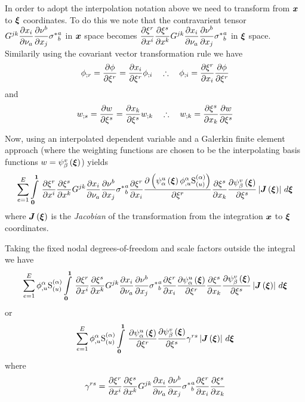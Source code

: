 In order to adopt the interpolation notation above we need to transform from
$\vect{x}$ to $\vect{\xi}$ coordinates. To do this we note that the
contravarient tensor
$G^{jk} \dfrac{\partial x_{i}}{\partial \nu_{a}}  \dfrac{\partial \nu^{b}}{\partial x_{j}} {\sigma^{*}}^{a}_{b}$ in
$\vect{x}$ space becomes
$ \dfrac{\partial \xi^{r}}{\partial x^{i}}  \dfrac{\partial \xi^{s}}{\partial x^{k}} G^{jk} \dfrac{\partial x_{i}}{\partial \nu_{a}}  \dfrac{\partial \nu^{b}}{\partial x_{j}} {\sigma^{*}}^{a}_{b}$
in $\vect{\xi}$ space. Similarily using the covariant vector transformation
rule we have
\begin{equation}
   {\phi}_{;r} = \dfrac{\partial \phi}{\partial \xi^{r}} = \dfrac{\partial x_{i}}{\partial \xi^{r}}  {\phi}_{;i} \quad\therefore\quad {\phi}_{;i} = \dfrac{\partial \xi^{r}}{\partial x_{i}}  \dfrac{\partial \phi}{\partial \xi^{r}} 
\end{equation}
and
\begin{equation}
   {w}_{;s} = \dfrac{\partial w}{\partial \xi^{s}} = \dfrac{\partial x_{k}}{\partial \xi^{s}}  {w}_{;k} \quad\therefore\quad {w}_{;k} = \dfrac{\partial \xi^{s}}{\partial x_{k}}  \dfrac{\partial w}{\partial \xi^{s}} 
\end{equation}

Now, using an interpolated dependent variable and a Galerkin finite element
approach (where the weighting functions are chosen to be the interpolating
basis functions \ie $w=\gbfn{\beta}{v}{\vect{\xi}}$) yields
\begin{equation}
  \dsum_{e=1}^{E}\gint{\vect{0}}{\vect{1}}{\delby{\xi^{r}}{x^{i}}\delby{\xi^{s}}{x^{k}}G^{jk}\delby{x_{i}}{\nu_{a}}\delby{\nu^{b}}{x_{j}}{\sigma^{*}}^{a}_{b}
    \delby{\xi^{r}}{x_{i}}\delby{\pbrac{\gbfn{\alpha}{u}{\vect{\xi}}\nodedof{\phi}{\alpha}{u}\gsf{(\alpha)}{(u)}}}{\xi^{r}}
    \delby{\xi^{s}}{x_{k}}\delby{\gbfn{\beta}{v}{\vect{\xi}}}{\xi^{s}}
    \abs{\fnof{\matr{J}}{\vect{\xi}}}}{\vect{\xi}}
\end{equation}
where $\fnof{\matr{J}}{\vect{\xi}}$ is the \emph{Jacobian} of the
transformation from the integration $\vect{x}$ to $\vect{\xi}$ coordinates.

Taking the fixed nodal degrees-of-freedom and scale factors outside the integral we have
\begin{equation}
  \dsum_{e=1}^{E}\nodedof{\phi}{\alpha}{u}\gsf{(\alpha)}{(u)}
  \gint{\vect{0}}{\vect{1}}{\delby{\xi^{r}}{x^{i}}\delby{\xi^{s}}{x^{k}}G^{jk}\delby{x_{i}}{\nu_{a}}\delby{\nu^{b}}{x_{j}}{\sigma^{*}}^{a}_{b}
    \delby{\xi^{r}}{x_{i}}\delby{\gbfn{\alpha}{u}{\vect{\xi}}}{\xi^{r}}
    \delby{\xi^{s}}{x_{k}}\delby{\gbfn{\beta}{v}{\vect{\xi}}}{\xi^{s}}
    \abs{\fnof{\matr{J}}{\vect{\xi}}}}{\vect{\xi}}
  \label{eqn:elementalfemlhs1}
\end{equation}
or
\begin{equation}
  \dsum_{e=1}^{E}\nodedof{\phi}{\alpha}{u}\gsf{(\alpha)}{(u)}
  \gint{\vect{0}}{\vect{1}}{\delby{\gbfn{\alpha}{u}{\vect{\xi}}}{\xi^{r}}\delby{\gbfn{\beta}{v}{\vect{\xi}}}{\xi^{s}}\gamma^{rs}
    \abs{\fnof{\matr{J}}{\vect{\xi}}}}{\vect{\xi}}
  \label{eqn:elementalfemlhs2}
\end{equation}
where
\begin{equation}
  \gamma^{rs}= \dfrac{\partial \xi^{r}}{\partial x^{i}}  \dfrac{\partial \xi^{s}}{\partial x^{k}} G^{jk} \dfrac{\partial x_{i}}{\partial \nu_{a}}  \dfrac{\partial \nu^{b}}{\partial x_{j}} {\sigma^{*}}^{a}_{b} \dfrac{\partial \xi^{r}}{\partial x_{i}}  \dfrac{\partial \xi^{s}}{\partial x_{k}} 
\end{equation}

